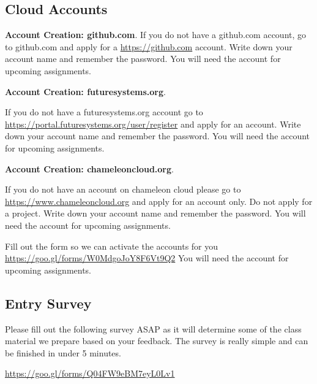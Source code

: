 \subsection{Cloud Accounts}
\label{a:accounts}
\begin{exercise}

  {\bf Account Creation: github.com}. If you do not have a github.com
  account, go to github.com and apply for a \url{https://github.com}
  account. Write down your account name and remember the password. You
  will need the account for upcoming assignments.

\end{exercise}

\begin{exercise}

  {\bf Account Creation: futuresystems.org}. 
  
  If you do not have a
  futuresystems.org account go to
  \url{https://portal.futuresystems.org/user/register} and apply for an
  account. Write down your account name and remember the password. You
  will need the account for upcoming assignments.

\end{exercise}

\begin{exercise}
  {\bf Account Creation: chameleoncloud.org}. 
  
  If you do not have an account on chameleon cloud please go to 
  \url{https://www.chameleoncloud.org} and apply for an
  account only. Do not apply for a project. Write down your account
  name and remember the password. You will need the account for
  upcoming assignments.
\end{exercise}

\begin{exercise}
Fill out the form so we can activate the accounts for you
\url{https://goo.gl/forms/W0MdgoJoY8F6Vt9Q2}
You will need the account for
  upcoming assignments.
\end{exercise}

\subsection{Entry Survey}
\label{a:survey-entry}
\begin{exercise}
Please fill out the following survey ASAP as it will determine some of the class material we prepare based on your feedback. The survey is really simple and can be finished in under 5 minutes.

\url{https://goo.gl/forms/Q04FW9eBM7eyL0Lv1}
\end{exercise}

